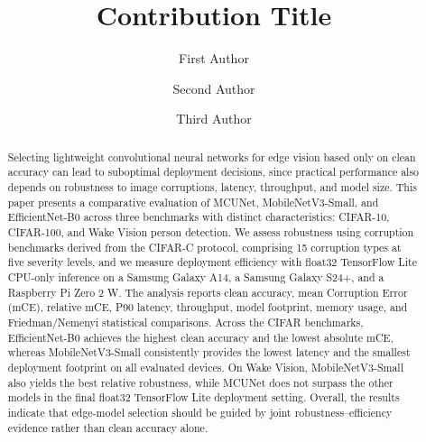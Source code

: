 \documentclass[runningheads]{llncs}
\begin{document}
\title{Contribution Title}

\author{First Author \and
Second Author \and
Third Author}



\maketitle

\begin{abstract}
Selecting lightweight convolutional neural networks for edge vision based only on clean accuracy can lead to suboptimal deployment decisions, since practical performance also depends on robustness to image corruptions, latency, throughput, and model size. This paper presents a comparative evaluation of MCUNet, MobileNetV3-Small, and EfficientNet-B0 across three benchmarks with distinct characteristics: CIFAR-10, CIFAR-100, and Wake Vision person detection. We assess robustness using corruption benchmarks derived from the CIFAR-C protocol, comprising 15 corruption types at five severity levels, and we measure deployment efficiency with float32 TensorFlow Lite CPU-only inference on a Samsung Galaxy A14, a Samsung Galaxy S24+, and a Raspberry Pi Zero 2 W. The analysis reports clean accuracy, mean Corruption Error (mCE), relative mCE, P90 latency, throughput, model footprint, memory usage, and Friedman/Nemenyi statistical comparisons. Across the CIFAR benchmarks, EfficientNet-B0 achieves the highest clean accuracy and the lowest absolute mCE, whereas MobileNetV3-Small consistently provides the lowest latency and the smallest deployment footprint on all evaluated devices. On Wake Vision, MobileNetV3-Small also yields the best relative robustness, while MCUNet does not surpass the other models in the final float32 TensorFlow Lite deployment setting. Overall, the results indicate that edge-model selection should be guided by joint robustness--efficiency evidence rather than clean accuracy alone.
\end{abstract}
\end{document}
